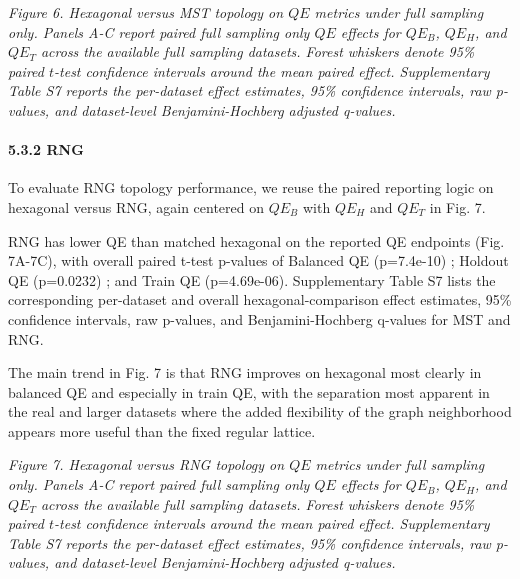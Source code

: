 \documentclass[
]{article}
\makeatletter
\newcommand*\pandocbounded[1]{%
  \sbox\pandoc@box{#1}%
  \Gscale@div\@tempa{\textheight}{\dimexpr\ht\pandoc@box+\dp\pandoc@box\relax}%
  \Gscale@div\@tempb{\linewidth}{\wd\pandoc@box}%
  \ifdim\@tempb\p@<\@tempa\p@\let\@tempa\@tempb\fi%
  \ifdim\@tempa\p@<\p@\scalebox{\@tempa}{\usebox\pandoc@box}%
  \else\usebox{\pandoc@box}%
  \fi%
}
\providecommand{\DIFadd}[1]{{\protect\color{blue} #1}} %
\providecommand{\DIFaddbegin}{} %
\providecommand{\DIFaddend}{} %
\makeatother
\begin{document}
\pandocbounded{}
\emph{Figure 6. Hexagonal versus MST topology on \(QE\) metrics under
full sampling only. Panels A-C report paired full sampling only \(QE\)
effects for \(QE_B\), \(QE_H\), and \(QE_T\) across the available full
sampling datasets. Forest whiskers denote 95\% paired \(t\)-test
confidence intervals around the mean paired effect. \DIFaddbegin \DIFadd{Supplementary Table
S7 reports the per-dataset effect estimates, 95\% confidence intervals,
raw p-values, and dataset-level Benjamini-Hochberg adjusted q-values.}\DIFaddend }

\paragraph{5.3.2 RNG}\label{rng}

To evaluate RNG topology performance, we reuse the paired reporting
logic on hexagonal versus RNG, again centered on \(QE_B\) with \(QE_H\)
and \(QE_T\) in Fig. 7.

RNG has lower QE than matched hexagonal on the reported QE  \DIFaddbegin \DIFadd{endpoints
}\DIFaddend (Fig.  \DIFaddbegin \DIFadd{7A-7C}\DIFaddend ), with overall paired t-test p-values of  \DIFaddbegin \DIFadd{Balanced }\DIFaddend QE
(p=7.4e-10) \DIFaddbegin \DIFadd{; Holdout }\DIFaddend QE (p=0.0232) \DIFaddbegin \DIFadd{; and Train }\DIFaddend QE (p=4.69e-06).
\DIFaddbegin \DIFadd{Supplementary Table S7 lists the corresponding per-dataset and overall
hexagonal-comparison effect estimates, 95\% confidence intervals, raw
p-values, and Benjamini-Hochberg q-values for MST and RNG.
}\DIFaddend

The main trend in Fig. 7 is that RNG improves on hexagonal most clearly
in balanced QE and especially in train QE, with the separation most
apparent in the real and larger datasets where the added flexibility of
the graph neighborhood appears more useful than the fixed regular
lattice.

\pandocbounded{}
\emph{Figure 7. Hexagonal versus RNG topology on \(QE\) metrics under
full sampling only. Panels A-C report paired full sampling only \(QE\)
effects for \(QE_B\), \(QE_H\), and \(QE_T\) across the available full
sampling datasets. Forest whiskers denote 95\% paired \(t\)-test
confidence intervals around the mean paired effect. \DIFaddbegin \DIFadd{Supplementary Table
S7 reports the per-dataset effect estimates, 95\% confidence intervals,
raw p-values, and dataset-level Benjamini-Hochberg adjusted q-values.}\DIFaddend }
\end{document}
